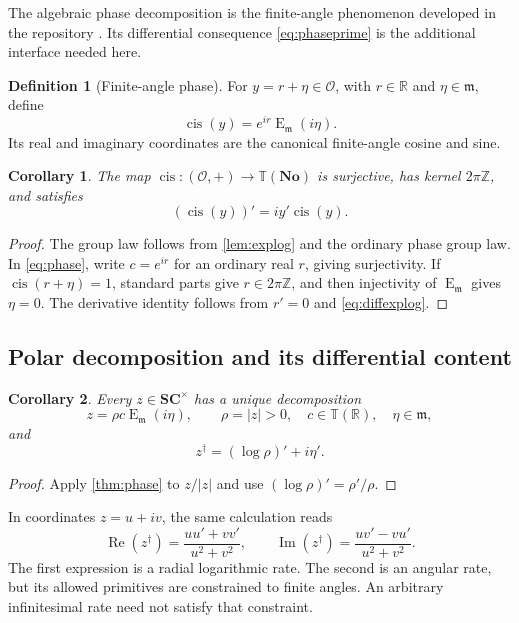 \documentclass[11pt,letterpaper]{article}
\numberwithin{equation}{section}
\newtheorem{corollary}[corollary]{Corollary}
\theoremstyle{definition}
\newtheorem{definition}[definition]{Definition}
\theoremstyle{remark}
\newcommand{\No}{\mathbf{No}}
\newcommand{\SC}{\mathbf{SC}}
\newcommand{\R}{\mathbb R}
\newcommand{\Z}{\mathbb Z}
\newcommand{\OO}{\mathcal O}
\newcommand{\mm}{\mathfrak m}
\newcommand{\im}{\operatorname{Im}}
\newcommand{\re}{\operatorname{Re}}
\newcommand{\cis}{\operatorname{cis}}
\newcommand{\Em}{\operatorname{E}_{\mm}}
\newcommand{\ttt}{\mathbb T}
\begin{document}
The algebraic phase decomposition is the finite-angle phenomenon developed in the repository \cite{RepoTrig}. Its differential consequence \eqref{eq:phaseprime} is the additional interface needed here.

\begin{definition}[Finite-angle phase]
For $y=r+\eta\in\OO$, with $r\in\R$ and $\eta\in\mm$, define
\[
 \cis(y)=e^{ir}\Em(i\eta).
\]
Its real and imaginary coordinates are the canonical finite-angle cosine and sine.
\end{definition}

\begin{corollary}\label{cor:cis}
The map $\cis:(\OO,+)\to\ttt(\No)$ is surjective, has kernel $2\pi\Z$, and satisfies
\[
 (\cis(y))'=i y'\cis(y).
\]
\end{corollary}
\begin{proof}
The group law follows from \cref{lem:explog} and the ordinary phase group law. In \eqref{eq:phase}, write $c=e^{ir}$ for an ordinary real $r$, giving surjectivity. If $\cis(r+\eta)=1$, standard parts give $r\in2\pi\Z$, and then injectivity of $\Em$ gives $\eta=0$. The derivative identity follows from $r'=0$ and \eqref{eq:diffexplog}.
\end{proof}

\subsection{Polar decomposition and its differential content}
\begin{corollary}\label{cor:polar}
Every $z\in\SC^\times$ has a unique decomposition
\[
 z=\rho c\Em(i\eta),\qquad
 \rho=|z|>0,\quad c\in\ttt(\R),\quad\eta\in\mm,
\]
and
\begin{equation}\label{eq:polarlogder}
 z^\dagger=(\log\rho)'+i\eta'.
\end{equation}
\end{corollary}
\begin{proof}
Apply \cref{thm:phase} to $z/|z|$ and use $(\log\rho)'=\rho'/\rho$.
\end{proof}

In coordinates $z=u+iv$, the same calculation reads
\begin{equation}\label{eq:coordinates}
 \re(z^\dagger)=\frac{uu'+vv'}{u^2+v^2},\qquad
 \im(z^\dagger)=\frac{uv'-vu'}{u^2+v^2}.
\end{equation}
The first expression is a radial logarithmic rate. The second is an angular rate, but its allowed primitives are constrained to finite angles. An arbitrary infinitesimal rate need not satisfy that constraint.
\end{document}
